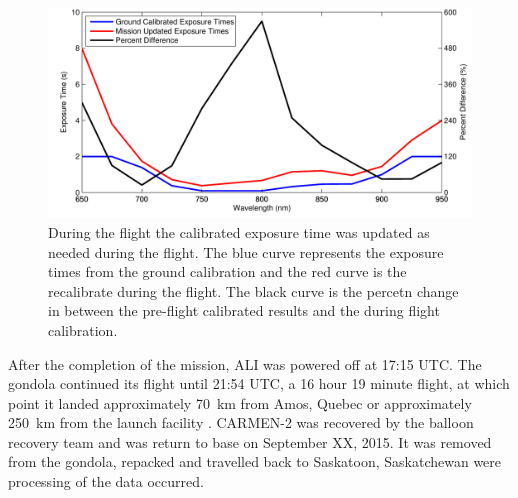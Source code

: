\begin{figure}
    \includegraphics[width=1.0\textwidth]{./Images/5-1-ExposureTimeComparisons.pdf}
    \caption[Exposure Time Update During Balloon Flight]{During the flight the calibrated exposure time was updated as needed during the flight. The blue curve represents the exposure times from the ground calibration and the red curve is the recalibrate during the flight. The black curve is the percetn change in between the pre-flight calibrated results and the during flight calibration.}
    \label{fig:5.1:exposureTimeComparisons}
\end{figure}

After the completion of the mission, ALI was powered off at 17:15 UTC. The gondola continued its flight until 21:54 UTC, a 16 hour 19 minute flight, at which point it landed approximately 70~km from Amos, Quebec or approximately 250~km from the launch facility . CARMEN-2 was recovered by the balloon recovery team and was return to base on September XX, 2015. It was removed from the gondola, repacked and travelled back to Saskatoon, Saskatchewan were processing of the data occurred. 